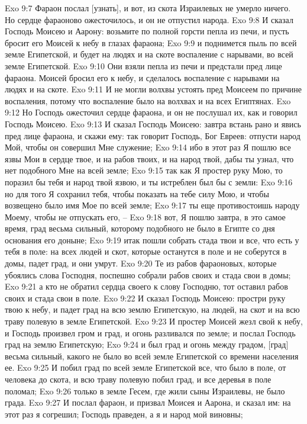 Exo 9:7  Фараон послал [узнать], и вот, из скота Израилевых не умерло ничего. Но сердце фараоново ожесточилось, и он не отпустил народа.
Exo 9:8  И сказал Господь Моисею и Аарону: возьмите по полной горсти пепла из печи, и пусть бросит его Моисей к небу в глазах фараона;
Exo 9:9  и поднимется пыль по всей земле Египетской, и будет на людях и на скоте воспаление с нарывами, во всей земле Египетской.
Exo 9:10  Они взяли пепла из печи и предстали пред лице фараона. Моисей бросил его к небу, и сделалось воспаление с нарывами на людях и на скоте.
Exo 9:11  И не могли волхвы устоять пред Моисеем по причине воспаления, потому что воспаление было на волхвах и на всех Египтянах.
Exo 9:12  Но Господь ожесточил сердце фараона, и он не послушал их, как и говорил Господь Моисею.
Exo 9:13  И сказал Господь Моисею: завтра встань рано и явись пред лице фараона, и скажи ему: так говорит Господь, Бог Евреев: отпусти народ Мой, чтобы он совершил Мне служение;
Exo 9:14  ибо в этот раз Я пошлю все язвы Мои в сердце твое, и на рабов твоих, и на народ твой, дабы ты узнал, что нет подобного Мне на всей земле;
Exo 9:15  так как Я простер руку Мою, то поразил бы тебя и народ твой язвою, и ты истреблен был бы с земли:
Exo 9:16  но для того Я сохранил тебя, чтобы показать на тебе силу Мою, и чтобы возвещено было имя Мое по всей земле;
Exo 9:17  ты еще противостоишь народу Моему, чтобы не отпускать его, --
Exo 9:18  вот, Я пошлю завтра, в это самое время, град весьма сильный, которому подобного не было в Египте со дня основания его доныне;
Exo 9:19  итак пошли собрать стада твои и все, что есть у тебя в поле: на всех людей и скот, которые останутся в поле и не соберутся в домы, падет град, и они умрут.
Exo 9:20  Те из рабов фараоновых, которые убоялись слова Господня, поспешно собрали рабов своих и стада свои в домы;
Exo 9:21  а кто не обратил сердца своего к слову Господню, тот оставил рабов своих и стада свои в поле.
Exo 9:22  И сказал Господь Моисею: простри руку твою к небу, и падет град на всю землю Египетскую, на людей, на скот и на всю траву полевую в земле Египетской.
Exo 9:23  И простер Моисей жезл свой к небу, и Господь произвел гром и град, и огонь разливался по земле; и послал Господь град на землю Египетскую;
Exo 9:24  и был град и огонь между градом, [град] весьма сильный, какого не было во всей земле Египетской со времени населения ее.
Exo 9:25  И побил град по всей земле Египетской все, что было в поле, от человека до скота, и всю траву полевую побил град, и все деревья в поле поломал;
Exo 9:26  только в земле Гесем, где жили сыны Израилевы, не было града.
Exo 9:27  И послал фараон, и призвал Моисея и Аарона, и сказал им: на этот раз я согрешил; Господь праведен, а я и народ мой виновны;
